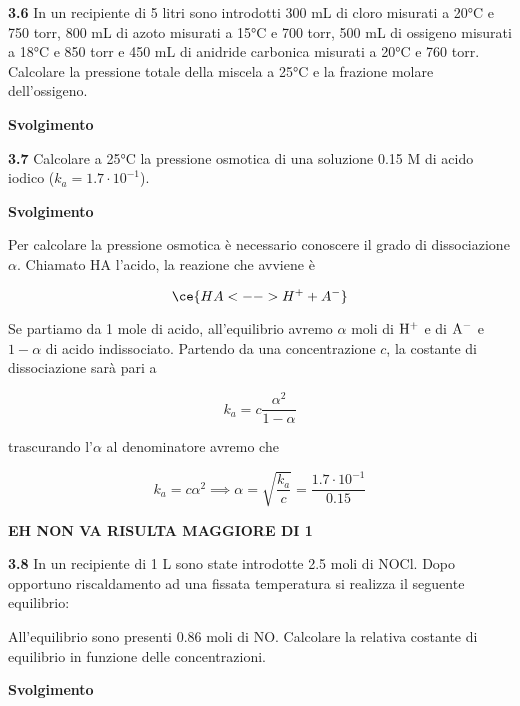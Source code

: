 \vspace{0.2cm}\textbf{3.6} In un recipiente di 5 litri sono introdotti 300 mL di cloro misurati a 20°C e 750 torr, 800 mL di azoto misurati a 15°C e 700 torr, 500 mL di ossigeno misurati a 18°C e 850 torr e 450 mL di anidride carbonica misurati a 20°C e 760 torr. Calcolare la pressione totale della miscela a 25°C e la frazione molare dell'ossigeno.

\vspace{0.2cm}\large\textbf{Svolgimento}\normalsize

\vspace{0.2cm}

\vspace{0.2cm}\textbf{3.7} Calcolare a 25°C la pressione osmotica di una soluzione 0.15 M di acido iodico ($k_a= 1.7 \cdot 10^{-1}$).

\vspace{0.2cm}\large\textbf{Svolgimento}\normalsize

\vspace{0.2cm}Per calcolare la pressione osmotica è necessario conoscere il grado di dissociazione $\alpha$. Chiamato HA l'acido, la reazione che avviene è

$$\ce{HA <--> H^+ + A^-}$$

Se partiamo da 1 mole di acido, all'equilibrio avremo $\alpha$ moli di $\rm H^+$ e di $\rm A^-$ e $1-\alpha$ di acido indissociato. Partendo da una concentrazione $c$, la costante di dissociazione sarà pari a

$$k_a=c \frac{\alpha^2}{1 - \alpha}$$

trascurando l'$\alpha$ al denominatore avremo che

$$k_a=c \alpha^2
\implies
\alpha=\sqrt{\frac{k_a}{c}}=\frac{1.7 \cdot 10^{-1}}{0.15}$$

\textbf{EH NON VA RISULTA MAGGIORE DI 1}

\vspace{0.2cm}\textbf{3.8} In un recipiente di 1 L sono state introdotte 2.5 moli di NOCl. Dopo opportuno riscaldamento ad una fissata temperatura si realizza il seguente equilibrio:

\begin{center}
\end{center}

All'equilibrio sono presenti 0.86 moli di NO. Calcolare la relativa costante di equilibrio in funzione delle concentrazioni.

\vspace{0.2cm}\large\textbf{Svolgimento}\normalsize

